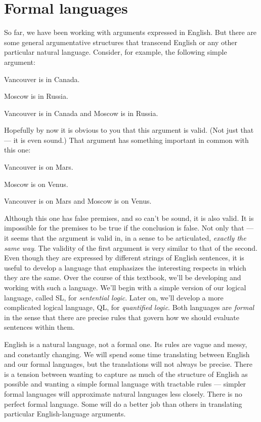 \section{Formal languages}
So far, we have been working with arguments expressed in English. But there are some general argumentative structures that transcend English or any other particular natural language. Consider, for example, the following simple argument:

\begin{earg}
\item[] Vancouver is in Canada.
\item[] Moscow is in Russia.
\item[\therefore] Vancouver is in Canada and Moscow is in Russia.
\end{earg}

Hopefully by now it is obvious to you that this argument is valid. (Not just that --- it is even sound.) That argument has something important in common with this one:

\begin{earg}
\item[] Vancouver is on Mars.
\item[] Moscow is on Venus.
\item[\therefore] Vancouver is on Mars and Moscow is on Venus.
\end{earg}

Although this one has false premises, and so can't be sound, it is also valid. It is impossible for the premises to be true if the conclusion is false. Not only that --- it seems that the argument is valid in, in a sense to be articulated, \emph{exactly the same way}. The validity of the first argument is very similar to that of the second. Even though they are expressed by different strings of English sentences, it is useful to develop a language that emphasizes the interesting respects in which they are the same. Over the course of this textbook, we'll be developing and working with such a language. We'll begin with a simple version of our logical language, called SL, for \emph{sentential logic}. Later on, we'll develop a more complicated logical language, QL, for \emph{quantified logic}. Both languages are \emph{formal} in the sense that there are precise rules that govern how we should evaluate sentences within them.

English is a natural language, not a formal one. Its rules are vague and messy, and constantly changing. We will spend some time translating between English and our formal languages, but the translations will not always be precise. There is a tension between wanting to capture as much of the structure of English as possible and wanting a simple formal language with tractable rules --- simpler formal languages will approximate natural languages less closely. There is no perfect formal language. Some will do a better job than others in translating particular English-language arguments.

